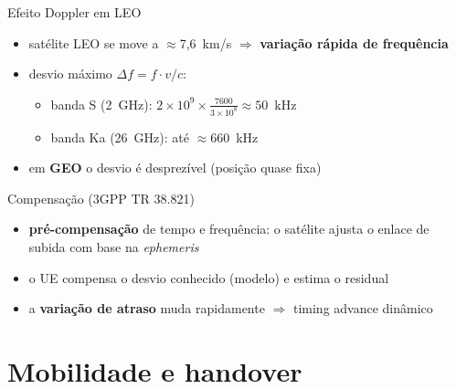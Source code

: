 \documentclass[aspectratio=169,11pt]{beamer}
\begin{document}
\begin{frame}{Efeito Doppler em LEO}
  \begin{itemize}
    \item satélite LEO se move a $\approx$7,6~km/s $\Rightarrow$ \textbf{variação rápida de frequência}
    \item desvio máximo $\Delta f = f \cdot v/c$:
      \begin{itemize}
        \item banda S (2~GHz): $2\times10^9 \times \frac{7600}{3\times10^8} \approx 50$~kHz
        \item banda Ka (26~GHz): até $\approx 660$~kHz
      \end{itemize}
    \item em \textbf{GEO} o desvio é desprezível (posição quase fixa)
  \end{itemize}
  \begin{block}{Compensação (3GPP TR 38.821)}
    \begin{itemize}
      \item \textbf{pré-compensação} de tempo e frequência: o satélite ajusta o enlace de subida com base na \emph{ephemeris}
      \item o UE compensa o desvio conhecido (modelo) e estima o residual
      \item a \textbf{variação de atraso} muda rapidamente $\Rightarrow$ timing advance dinâmico
    \end{itemize}
  \end{block}
\end{frame}

\section{Mobilidade e handover}
\end{document}

